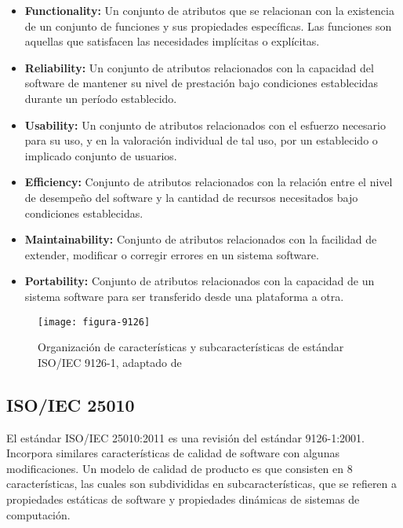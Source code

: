 \begin{itemize}
	\item \textbf{Functionality:} Un conjunto de atributos que se relacionan con 
	la existencia de un conjunto de funciones y sus propiedades específicas. 
	Las funciones son aquellas que satisfacen las necesidades implícitas o explícitas.
	
	\item \textbf{Reliability:} Un conjunto de atributos relacionados con la capacidad 
	del software de mantener su nivel de prestación bajo condiciones establecidas 
	durante un período establecido.
	
	\item \textbf{Usability:} Un conjunto de atributos relacionados con el esfuerzo 
	necesario para su uso, y en la valoración individual de tal uso, por un establecido 
	o implicado conjunto de usuarios.
	
	\item \textbf{Efficiency:} Conjunto de atributos relacionados con la relación entre 
	el nivel de desempeño del software y la cantidad de recursos necesitados 
	bajo condiciones establecidas.
	
	\item \textbf{Maintainability:} Conjunto de atributos relacionados con la facilidad 
	de extender, modificar o corregir errores en un sistema software.
	
	\item \textbf{Portability:} Conjunto de atributos relacionados con la capacidad 
	de un sistema software para ser transferido desde una plataforma a otra.
\end{itemize}


\begin{figure}[h!]
	\centering
	\texttt{[image: figura-9126]}
	\caption[Organización de características y subcaracterísticas de estándar ISO/IEC 9126-1]{Organización de características y subcaracterísticas de estándar ISO/IEC 9126-1, adaptado de \cite{ISO/IEC2001}}
	\label{fig:caracteristicas-9126}
\end{figure}
\bigskip


\subsection{ISO/IEC 25010}

El estándar ISO/IEC 25010:2011 es una revisión del estándar
9126-1:2001. Incorpora similares características de calidad de software
con algunas modificaciones. Un modelo de calidad de producto es 
que consisten en 8 características, las cuales son subdivididas en 
subcaracterísticas, que se refieren a propiedades estáticas de software
y propiedades dinámicas de sistemas de computación.

